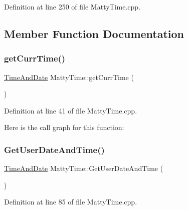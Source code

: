 Definition at line 250 of file Matty\+Time.\+cpp.



\subsection{Member Function Documentation}
\hypertarget{classMattyTime_a64fff9c9a7da58881a4c0cc1a2ac84f7}{}\label{classMattyTime_a64fff9c9a7da58881a4c0cc1a2ac84f7} 
\subsubsection{\texorpdfstring{get\+Curr\+Time()}{getCurrTime()}}
{\footnotesize\ttfamily \hyperlink{structTimeAndDate}{Time\+And\+Date} Matty\+Time\+::get\+Curr\+Time (\begin{DoxyParamCaption}{ }\end{DoxyParamCaption})\hspace{0.3cm}{\ttfamily [static]}}



Definition at line 41 of file Matty\+Time.\+cpp.

Here is the call graph for this function\+:
\hypertarget{classMattyTime_ac2f2f818e4c476cc11f9c13e97cacfae}{}\label{classMattyTime_ac2f2f818e4c476cc11f9c13e97cacfae} 
\subsubsection{\texorpdfstring{Get\+User\+Date\+And\+Time()}{GetUserDateAndTime()}}
{\footnotesize\ttfamily \hyperlink{structTimeAndDate}{Time\+And\+Date} Matty\+Time\+::\+Get\+User\+Date\+And\+Time (\begin{DoxyParamCaption}{ }\end{DoxyParamCaption})}



Definition at line 85 of file Matty\+Time.\+cpp.

\hypertarget{classMattyTime_ad2f12ac7d1a959ee9e19a4eac30484fd}{}\label{classMattyTime_ad2f12ac7d1a959ee9e19a4eac30484fd} 
